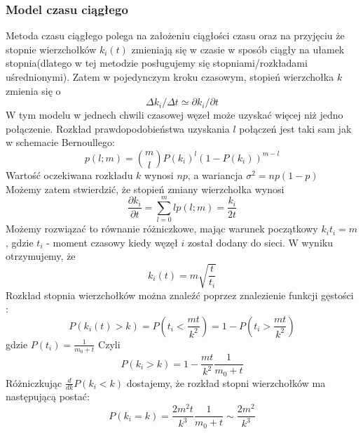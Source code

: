 \documentclass{article}
\begin{document}
\subsubsection{Model czasu ciągłego}
	Metoda czasu ciągłego polega na założeniu ciągłości czasu oraz na przyjęciu że stopnie wierzchołków $k_i(t)$ zmieniają się w czasie w sposób ciągły na ułamek stopnia(dlatego w tej metodzie posługujemy się stopniami/rozkładami uśrednionymi).
	Zatem w pojedynczym kroku czasowym, stopień wierzchołka $k$ zmienia się o
	\begin{equation}
	\Delta k_i/\Delta t \simeq \partial k_i / \partial t
	\end{equation}
		W tym modelu w jednech chwili czasowej węzeł może uzyskać więcej niż jedno połączenie. Rozkład prawdopodobieństwa uzyskania $l$ połączeń jest taki sam jak w schemacie Bernoullego:
		\begin{equation}
		p(l;m) = \binom{m}{l}P(k_i)^l(1 - P(k_i))^{m -l}
		\end{equation}
	Wartość oczekiwana rozkładu $k$ wynosi $np$, a wariancja $\sigma^2 = np(1 - p)$\\ Możemy zatem stwierdzić, że stopień zmiany wierzchołka wynosi
	\begin{equation}
		\frac{\partial k_i}{\partial t} = \sum_{l = 0}^m lp(l; m) = \frac{k_i} {2t}
	\end{equation}
	Możemy rozwiązać to równanie różniczkowe, mając warunek początkowy $k_i{t_i} = m$, gdzie $t_i$ - moment czasowy kiedy węzęł $i$ został dodany do sieci. W wyniku otrzymujemy, że 
	\begin{equation}
		k_i(t) = m \sqrt{\frac{t}{t_i}}
	\end{equation}
	Rozkład stopnia wierzchołków można znaleźć poprzez znalezienie funkcji gęstości :
	\begin{equation}
		P(k_i(t) > k) = P(t_i < \frac{mt}{k^2}) = 1 - P(t_i > \frac{mt}{k^2})
	\end{equation}
	gdzie $P(t_i) = \frac{1}{m_0 + t}$ Czyli 
	\begin{equation}
		P(k_i > k) = 1 - \frac{mt}{k^2}\frac{1}{m_0 + t}
	\end{equation}
	Różniczkując $\frac{d}{dk}P(k_i < k)$ dostajemy, że rozkład stopni wierzchołków ma następującą postać:
	\begin{equation}
	P(k_i = k) = \frac{2m^2t}{k^3}\frac{1}{m_0 + t} \sim \frac{2m^2}{k^3}
	\end{equation}
\end{document}
